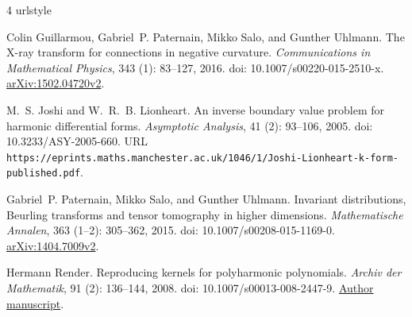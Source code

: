 \documentclass[11pt,a4paper]{article}
\numberwithin{equation}{section}
\begin{document}
\begin{thebibliography}{4}
\providecommand{\natexlab}[1]{#1}
\providecommand{\url}[1]{\texttt{#1}}
\expandafter\ifx\csname urlstyle\endcsname\relax
  \providecommand{\doi}[1]{doi: #1}\else
  \providecommand{\doi}{doi: \begingroup \urlstyle{rm}\Url}\fi

Colin Guillarmou, Gabriel~P. Paternain, Mikko Salo, and Gunther Uhlmann.
\newblock The {X}-ray transform for connections in negative curvature.
\newblock \emph{Communications in Mathematical Physics}, 343
  (1): 83--127, 2016.
\newblock \doi{10.1007/s00220-015-2510-x}.
\newblock \href{https://arxiv.org/abs/1502.04720v2}{arXiv:1502.04720v2}.

M.~S. Joshi and W.~R.~B. Lionheart.
\newblock An inverse boundary value problem for harmonic differential forms.
\newblock \emph{Asymptotic Analysis}, 41 (2): 93--106, 2005.
\newblock \doi{10.3233/ASY-2005-660}.
\newblock URL
  \url{https://eprints.maths.manchester.ac.uk/1046/1/Joshi-Lionheart-k-form-published.pdf}.

Gabriel~P. Paternain, Mikko Salo, and Gunther Uhlmann.
\newblock Invariant distributions, {Beurling} transforms and tensor tomography
  in higher dimensions.
\newblock \emph{Mathematische Annalen}, 363 (1--2): 305--362,
  2015.
\newblock \doi{10.1007/s00208-015-1169-0}.
\newblock \href{https://arxiv.org/abs/1404.7009v2}{arXiv:1404.7009v2}.

Hermann Render.
\newblock Reproducing kernels for polyharmonic polynomials.
\newblock \emph{Archiv der Mathematik}, 91 (2): 136--144,
  2008.
\newblock \doi{10.1007/s00013-008-2447-9}.
\newblock \href{https://hdl.handle.net/10197/5499}{Author manuscript}.

\end{thebibliography}
\end{document}
